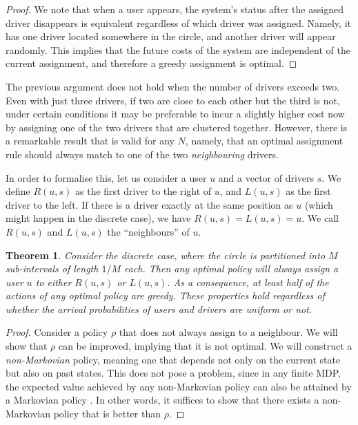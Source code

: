 \documentclass[12pt,english]{article}
\newtheorem{theorem}{Theorem}
\begin{document}
{\begin{proof}
    We note that when a user appears, the system's status after the assigned driver disappears is equivalent regardless of which driver was assigned. Namely, it has one driver located somewhere in the circle, and another driver will appear randomly. This implies that the future costs of the system are independent of the current assignment, and therefore a greedy assignment is optimal.
\end{proof}

The previous argument does not hold when the number of drivers exceeds two. Even with just three drivers, if two are close to each other but the third is not, under certain conditions it may be preferable to incur a slightly higher cost now by assigning one of the two drivers that are clustered together. However, there is a remarkable result that is valid for any $N$, namely, that an optimal assignment rule should always match to one of the two \textit{neighbouring} drivers.

In order to formalise this, let us consider a user $u$ and a vector of drivers $s$. We define $R(u,s)$ as the first driver to the right of $u$, and $L(u,s)$ as the first driver to the left. If there is a driver exactly at the same position as $u$ (which might happen in the discrete case), we have $R(u,s)=L(u,s)=u$. We call $R(u,s)$ and $L(u,s)$ the ``neighbours'' of $u$.


\begin{theorem}\label{Thm:NeihbourDrivers}
Consider the discrete case, where the circle is partitioned into $M$ sub-intervals of length $1/M$ each. 
Then any optimal policy will always assign a user $u$ to either $R(u,s)$ or $L(u,s)$.
As a consequence, at least half of the actions of any optimal policy are greedy.
These properties hold regardless of whether the arrival probabilities of users and drivers are uniform or not.
\end{theorem}

\begin{proof}
Consider a policy $\rho$ that does not always assign to a neighbour. We will show that $\rho$ can be improved, implying that it is not optimal. We will construct a \textit{non-Markovian} policy, meaning one that depends not only on the current state but also on past states. This does not pose a problem, since in any finite MDP, the expected value achieved by any non-Markovian policy can also be attained by a Markovian policy \citep{puterman2014markov}. In other words, it suffices to show that there exists a non-Markovian policy that is better than $\rho$.


\end{proof}}
\end{document}
